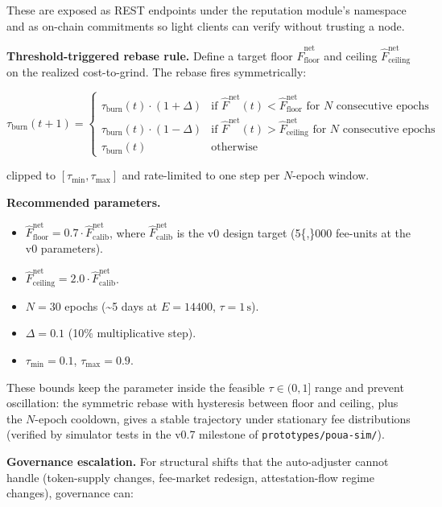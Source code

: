 \documentclass[
  11pt,
]{article}
\providecommand{\tightlist}{%
  \setlength{\itemsep}{0pt}\setlength{\parskip}{0pt}}
\begin{document}
These are exposed as REST endpoints under the reputation module's
namespace and as on-chain commitments so light clients can verify
without trusting a node.

\textbf{Threshold-triggered rebase rule.} Define a target floor
\(\hat{F}^{\text{net}}_{\text{floor}}\) and ceiling
\(\hat{F}^{\text{net}}_{\text{ceiling}}\) on the realized cost-to-grind.
The rebase fires symmetrically:

\[\tau_{\text{burn}}(t+1) = \begin{cases}
\tau_{\text{burn}}(t) \cdot (1 + \Delta) & \text{if } \hat{F}^{\text{net}}(t) < \hat{F}^{\text{net}}_{\text{floor}} \text{ for } N \text{ consecutive epochs} \\
\tau_{\text{burn}}(t) \cdot (1 - \Delta) & \text{if } \hat{F}^{\text{net}}(t) > \hat{F}^{\text{net}}_{\text{ceiling}} \text{ for } N \text{ consecutive epochs} \\
\tau_{\text{burn}}(t) & \text{otherwise}
\end{cases}\]

clipped to \([\tau_{\min}, \tau_{\max}]\) and rate-limited to one step
per \(N\)-epoch window.

\textbf{Recommended parameters.}

\begin{itemize}
\tightlist
\item
  \(\hat{F}^{\text{net}}_{\text{floor}} = 0.7 \cdot \hat{F}^{\text{net}}_{\text{calib}}\),
  where \(\hat{F}^{\text{net}}_{\text{calib}}\) is the v0 design target
  (5\{,\}000 fee-units at the v0 parameters).
\item
  \(\hat{F}^{\text{net}}_{\text{ceiling}} = 2.0 \cdot \hat{F}^{\text{net}}_{\text{calib}}\).
\item
  \(N = 30\) epochs (\textasciitilde5 days at \(E = 14400\),
  \(\tau = 1\,\text{s}\)).
\item
  \(\Delta = 0.1\) (10\% multiplicative step).
\item
  \(\tau_{\min} = 0.1\), \(\tau_{\max} = 0.9\).
\end{itemize}

These bounds keep the parameter inside the feasible \(\tau \in (0, 1]\)
range and prevent oscillation: the symmetric rebase with hysteresis
between floor and ceiling, plus the \(N\)-epoch cooldown, gives a stable
trajectory under stationary fee distributions (verified by simulator
tests in the v0.7 milestone of \texttt{prototypes/poua-sim/}).

\textbf{Governance escalation.} For structural shifts that the
auto-adjuster cannot handle (token-supply changes, fee-market redesign,
attestation-flow regime changes), governance can:
\end{document}
